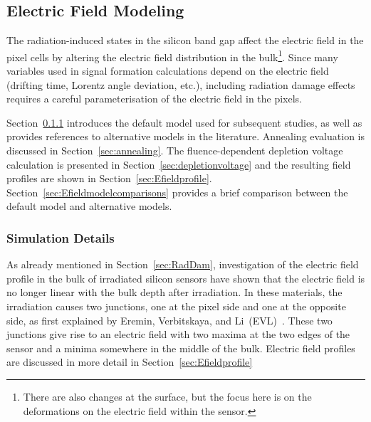 \subsection{Electric Field Modeling}
\label{sec:ElecFieldMod}
The radiation-induced states in the silicon band gap affect the electric field in the pixel cells by altering 
the electric field distribution in the bulk\footnote{There are also changes at the surface, but the focus 
here is on the deformations on the electric field within the sensor.}. Since many variables used in signal 
formation calculations depend on the electric field (drifting time, Lorentz angle deviation, etc.), including 
radiation damage effects requires a careful parameterisation of the electric field in the pixels. 

Section~\ref{sec:ElectricField:SimulationDetails} introduces the default model used for subsequent studies, as well as provides references to alternative models in the literature.  Annealing evaluation is 
discussed in Section~\ref{sec:annealing}. The fluence-dependent depletion voltage calculation is presented in Section~\ref{sec:depletionvoltage} and the resulting field profiles are shown in Section~\ref{sec:Efieldprofile}.  Section~\ref{sec:Efieldmodelcomparisons} provides a brief comparison between the default model and alternative models.

\subsubsection{Simulation Details}
\label{sec:ElectricField:SimulationDetails}



As already mentioned in Section~\ref{sec:RadDam}, investigation of the electric field profile in the bulk of irradiated silicon sensors have shown that the electric field is no longer linear with the bulk depth after irradiation. In these materials, the irradiation causes two junctions, one at the pixel side and one at the opposite side, as first explained by Eremin, Verbitskaya, and Li~(EVL)~\cite{bib:DP}. These two junctions give rise to an electric field with two maxima at the two edges of the sensor and a minima somewhere in the middle of the bulk.  Electric field profiles are discussed in more detail in Section~\ref{sec:Efieldprofile}

